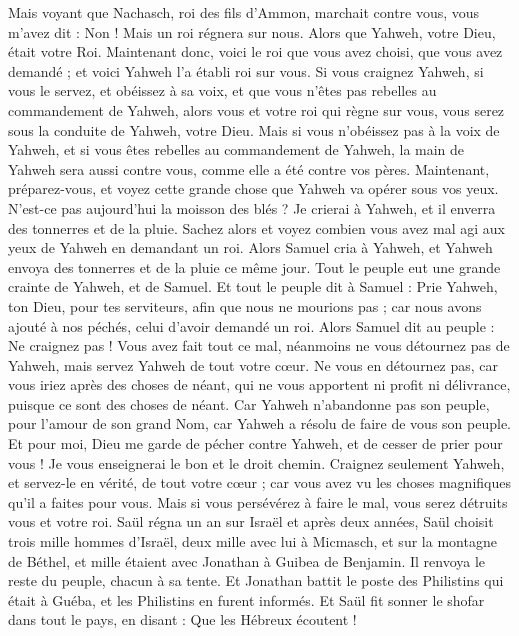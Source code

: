 \begin{multicols}{2}
Mais voyant que Nachasch, roi des fils d'Ammon, marchait contre vous, vous m'avez dit : Non ! Mais un roi régnera sur nous. Alors que Yahweh, votre Dieu, était votre Roi.
Maintenant donc, voici le roi que vous avez choisi, que vous avez demandé ; et voici Yahweh l'a établi roi sur vous.
Si vous craignez Yahweh, si vous le servez, et obéissez à sa voix, et que vous n'êtes pas rebelles au commandement de Yahweh, alors vous et votre roi qui règne sur vous, vous serez sous la conduite de Yahweh, votre Dieu.
Mais si vous n'obéissez pas à la voix de Yahweh, et si vous êtes rebelles au commandement de Yahweh, la main de Yahweh sera aussi contre vous, comme elle a été contre vos pères.
Maintenant, préparez-vous, et voyez cette grande chose que Yahweh va opérer sous vos yeux.
N'est-ce pas aujourd'hui la moisson des blés ? Je crierai à Yahweh, et il enverra des tonnerres et de la pluie. Sachez alors et voyez combien vous avez mal agi aux yeux de Yahweh en demandant un roi.
Alors Samuel cria à Yahweh, et Yahweh envoya des tonnerres et de la pluie ce même jour. Tout le peuple eut une grande crainte de Yahweh, et de Samuel.
Et tout le peuple dit à Samuel : Prie Yahweh, ton Dieu, pour tes serviteurs, afin que nous ne mourions pas ; car nous avons ajouté à nos péchés, celui d'avoir demandé un roi.
Alors Samuel dit au peuple : Ne craignez pas ! Vous avez fait tout ce mal, néanmoins ne vous détournez pas de Yahweh, mais servez Yahweh de tout votre cœur.
Ne vous en détournez pas, car vous iriez après des choses de néant, qui ne vous apportent ni profit ni délivrance, puisque ce sont des choses de néant.
Car Yahweh n'abandonne pas son peuple, pour l'amour de son grand Nom, car Yahweh a résolu de faire de vous son peuple.
Et pour moi, Dieu me garde de pécher contre Yahweh, et de cesser de prier pour vous ! Je vous enseignerai le bon et le droit chemin.
Craignez seulement Yahweh, et servez-le en vérité, de tout votre cœur ; car vous avez vu les choses magnifiques qu'il a faites pour vous.
Mais si vous persévérez à faire le mal, vous serez détruits vous et votre roi.
\VerseOne{}Saül régna un an sur Israël et après deux années,
Saül choisit trois mille hommes d'Israël, deux mille avec lui à Micmasch, et sur la montagne de Béthel, et mille étaient avec Jonathan à Guibea de Benjamin. Il renvoya le reste du peuple, chacun à sa tente.
Et Jonathan battit le poste des Philistins qui était à Guéba, et les Philistins en furent informés. Et Saül fit sonner le shofar dans tout le pays, en disant : Que les Hébreux écoutent !

\end{multicols}
